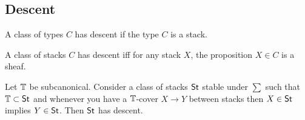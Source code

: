 %	
%	
%	
%	

\subsection{Descent}

\begin{definition}
	A class of types $C$ has descent if the type $C$ is a stack. 
\end{definition}
\begin{lemma}{\label{lemma:descentAsPredicateSheaf}}
	A class of stacks $C$ has descent iff for any stack $X$, the proposition $X \in C$ is a sheaf.
\end{lemma}
\begin{theorem}
	Let $\mathbb{T}$ be subcanonical.
	Consider a class of stacks $\mathsf{St}$ stable under $\sum$ such that $\mathbb{T} \subset \mathsf{St}$ and whenever you have a $\mathbb{T}$-cover $X \to Y$ between stacks then $X \in \mathsf{St}$ implies $Y \in \mathsf{St}$.
	Then $\mathsf{St}$ has descent.
\end{theorem}

